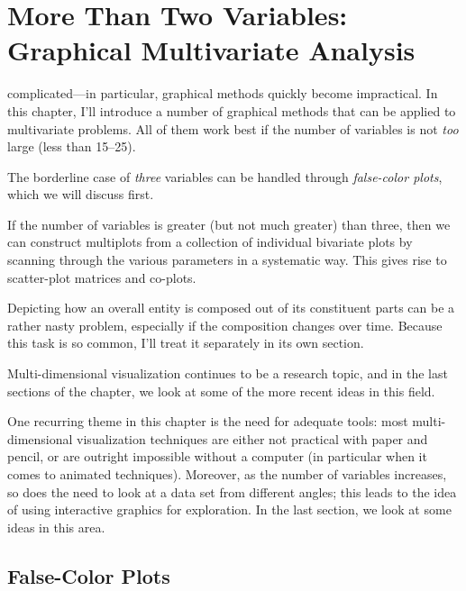 

\chapter{More Than Two Variables: Graphical Multivariate Analysis}{}{}
\label{ch:multivariate}


 complicated---in particular,
graphical methods quickly become impractical. In this chapter, I'll
introduce a number of graphical methods that can be applied to
multivariate problems. All of them work best if the number of variables
is not \emph{too} large (less than 15--25).

The borderline case of \emph{three} variables can be handled through
\emph{false-color plots}, which we will discuss first.

If the number of variables is greater (but not much greater) than
three, then we can construct multiplots from a collection of
individual bivariate plots by scanning through the various parameters
in a systematic way. This gives rise to scatter-plot matrices and
co-plots.

Depicting how an overall entity is composed out of its constituent
parts can be a rather nasty problem, especially if the composition
changes over time. Because this task is so common, I'll treat it
separately in its own section.

Multi-dimensional visualization continues to be a research topic, and in
the last sections of the chapter, we look at some of the more recent
ideas in this field.

One recurring theme in this chapter is the need for adequate tools:
most multi-\break dimensional visualization techniques are either not
practical with paper and pencil, or are outright impossible without a
computer (in particular when it comes to animated techniques).
Moreover, as the number of variables increases, so does the need to
look at a data set from different angles; this leads to the idea of
using interactive graphics for exploration. In the last section, we
look at some ideas in this area.

\section{False-Color Plots}

